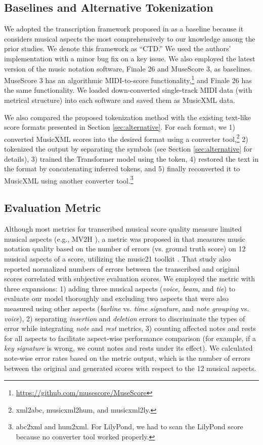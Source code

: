 \documentclass[sigconf]{acmart} %
\begin{document}
\subsection{Baselines and Alternative Tokenization}
We adopted the transcription framework proposed in \cite{Cogliati2016} as a baseline because it considers musical aspects the most comprehensively to our knowledge among the prior studies. We denote this framework as “CTD.” We used the authors’ implementation with a minor bug fix on a key issue. We also employed the latest version of the music notation software, Finale 26 and MuseScore 3, as baselines. MuseScore 3 has an algorithmic MIDI-to-score functionality,\footnote{\url{https://github.com/musescore/MuseScore}} and Finale 26 has the same functionality. We loaded down-converted single-track MIDI data (with metrical structure) into each software and saved them as MusicXML data.

We also compared the proposed tokenization method with the existing text-like score formats presented in Section \ref{sec:alternative}. For each format, we 1) converted MusicXML scores into the desired format using a converter tool,\footnote{xml2abc, musicxml2hum, and musicxml2ly.}  2) tokenized the output by separating the symbols (see Section \ref{sec:alternative} for details), 3) trained the Transformer model using the token, 4) restored the text in the format by concatenating inferred tokens, and 5) finally reconverted it to MusicXML using another converter tool.\footnote{abc2xml and hum2xml. For LilyPond, we had to scan the LilyPond score because no converter tool worked properly.}

\subsection{Evaluation Metric}
Although most metrics for transcribed musical score quality measure limited musical aspects (e.g., MV2H \cite{McLeod2018}), a metric was proposed in \cite{Cogliati2017} that measures music notation quality based on the number of errors (vs. ground truth score) on 12 musical aspects of a score, utilizing the music21 toolkit \cite{Cuthbert2010}. That study also reported normalized numbers of errors between the transcribed and original scores correlated with subjective evaluation scores. We employed the metric with three expansions: 1) adding three musical aspects (\textit{voice, beam,} and \textit{tie}) to evaluate our model thoroughly and excluding two aspects that were also measured using other aspects (\textit{barline} vs. \textit{time signature}, and \textit{note grouping} vs. \textit{voice}), 2) separating \textit{insertion} and \textit{deletion} errors to discriminate the types of error while integrating \textit{note} and \textit{rest} metrics, 3) counting affected notes and rests for all aspects to facilitate aspect-wise performance comparison (for example, if a \textit{key signature} is wrong, we count notes and rests under its effect). We calculated note-wise error rates based on the metric output, which is the number of errors between the original and generated scores with respect to the 12 musical aspects.
\end{document}
